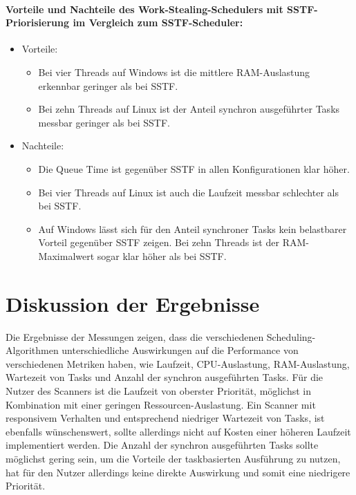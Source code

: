 \begin{sloppypar}
\paragraph{Vorteile und Nachteile des Work-Stealing-Schedulers mit \acs{SSTF}-Priorisierung im Vergleich zum \acs{SSTF}-Scheduler:}
\begin{itemize}
    \item Vorteile:
    \begin{itemize}
        \item Bei vier Threads auf Windows ist die mittlere \acs{RAM}-Auslastung erkennbar geringer als bei \acs{SSTF}.
        \item Bei zehn Threads auf Linux ist der Anteil synchron ausgeführter Tasks messbar geringer als bei \acs{SSTF}.
    \end{itemize}
    \item Nachteile:
    \begin{itemize}
        \item Die Queue Time ist gegenüber \acs{SSTF} in allen Konfigurationen klar höher.
        \item Bei vier Threads auf Linux ist auch die Laufzeit messbar schlechter als bei \acs{SSTF}.
        \item Auf Windows lässt sich für den Anteil synchroner Tasks kein belastbarer Vorteil gegenüber \acs{SSTF} zeigen. Bei zehn Threads ist der \acs{RAM}-Maximalwert sogar klar höher als bei \acs{SSTF}.
    \end{itemize}
\end{itemize}


\section{Diskussion der Ergebnisse}

\noindent Die Ergebnisse der Messungen zeigen, dass die verschiedenen Scheduling-Algorithmen 
unterschiedliche Auswirkungen auf die Performance
von verschiedenen Metriken haben, wie Laufzeit, \acs{CPU}-Auslastung, \acs{RAM}-Auslastung, 
Wartezeit von Tasks und Anzahl der synchron ausgeführten Tasks.
Für die Nutzer des Scanners ist die Laufzeit von oberster Priorität, 
möglichst in Kombination mit einer geringen Ressourcen-Auslastung.
Ein Scanner mit responsivem Verhalten und entsprechend niedriger Wartezeit von Tasks, 
ist ebenfalls wünschenswert, sollte allerdings nicht auf Kosten einer höheren Laufzeit implementiert werden.
Die Anzahl der synchron ausgeführten Tasks sollte möglichst gering sein, um die Vorteile der taskbasierten Ausführung zu nutzen,
hat für den Nutzer allerdings keine direkte Auswirkung und somit eine niedrigere Priorität.


\end{sloppypar}

